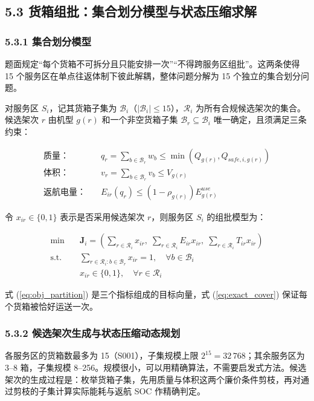 \documentclass[withoutpreface,bwprint]{format}
\begin{document}
\subsection{5.3 货箱组批：集合划分模型与状态压缩求解}

\subsubsection{5.3.1 集合划分模型}
题面规定“每个货箱不可拆分且只能安排一次”“不得跨服务区组批”。这两条使得 15 个服务区在单点往返体制下彼此解耦，整体问题分解为 15 个独立的集合划分问题\cite{balas1976, nemhauser1988}。

对服务区 $S_i$，记其货箱子集为 $\mathcal{B}_i$（$|\mathcal{B}_i| \le 15$），$\mathcal{R}_i$ 为所有合规候选架次的集合。候选架次 $r$ 由机型 $g(r)$ 和一个非空货箱子集 $\mathcal{B}_r \subseteq \mathcal{B}_i$ 唯一确定，且须满足三条约束：

\begin{align}
\text{质量：} \quad & q_r = \sum_{b \in \mathcal{B}_r} w_b \le \min\left(Q_{g(r)}, Q_{safe, i, g(r)}\right) \\
\text{体积：} \quad & v_r = \sum_{b \in \mathcal{B}_r} v_b \le V_{g(r)} \\
\text{返航电量：} \quad & E_{ir}(q_r) \le (1 - \rho_{g(r)}) E_{g(r)}^{use}
\end{align}

令 $x_{ir} \in \{0,1\}$ 表示是否采用候选架次 $r$，则服务区 $S_i$ 的组批模型为：

\begin{align}
\min \quad & \bm{J}_i = \left( \sum_{r \in \mathcal{R}_i} x_{ir}, \; \sum_{r \in \mathcal{R}_i} E_{ir} x_{ir}, \; \sum_{r \in \mathcal{R}_i} T_{ir} x_{ir} \right) \label{eq:obj_partition} \\
\text{s.t.} \quad & \sum_{r \in \mathcal{R}_i : b \in \mathcal{B}_r} x_{ir} = 1, \quad \forall b \in \mathcal{B}_i \label{eq:exact_cover} \\
& x_{ir} \in \{0, 1\}, \quad \forall r \in \mathcal{R}_i
\end{align}

式 (\ref{eq:obj_partition}) 是三个指标组成的目标向量，式 (\ref{eq:exact_cover}) 保证每个货箱被恰好运送一次。

\subsubsection{5.3.2 候选架次生成与状态压缩动态规划}
各服务区的货箱数最多为 15（S001），子集规模上限 $2^{15}=32\,768$；其余服务区为 3--8 箱，子集规模 8--256。规模很小，可以用精确算法，不需要启发式方法。候选架次的生成过程是：枚举货箱子集，先用质量与体积这两个廉价条件剪枝，再对通过剪枝的子集计算实际能耗与返航 SOC 作精确判定。
\end{document}
